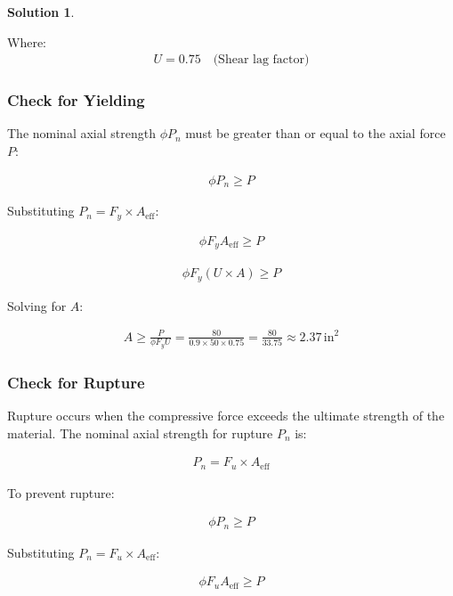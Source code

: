 \documentclass[12pt]{article}
\theoremstyle{definition} %
\newtheorem{solution}{Solution}
\theoremstyle{plain} %
\begin{document}
\begin{solution}
\begin{enumerate}
Where:
\begin{align}
U = 0.75 \quad \text{(Shear lag factor)}
\end{align}

\subsubsection*{Check for Yielding}

The nominal axial strength \( \phi P_n \) must be greater than or equal to the axial force \( P \):

\begin{align}
\phi P_n \geq P \tag{3}
\end{align}

Substituting \( P_n = F_y \times A_{\text{eff}} \):

\begin{align}
\phi F_y A_{\text{eff}} \geq P \tag{4}
\end{align}

\begin{align}
\phi F_y (U \times A) \geq P \tag{5}
\end{align}

Solving for \( A \):

\begin{align}
A \geq \frac{P}{\phi F_y U} = \frac{80}{0.9 \times 50 \times 0.75} = \frac{80}{33.75} \approx 2.37 \, \text{in}^2 \tag{6}
\end{align}

\subsubsection*{Check for Rupture}

Rupture occurs when the compressive force exceeds the ultimate strength of the material. The nominal axial strength for rupture \( P_n \) is:

\begin{align}
P_n = F_u \times A_{\text{eff}} \tag{7}
\end{align}

To prevent rupture:

\begin{align}
\phi P_n \geq P \tag{8}
\end{align}

Substituting \( P_n = F_u \times A_{\text{eff}} \):

\begin{align}
\phi F_u A_{\text{eff}} \geq P \tag{9}
\end{align}


\end{enumerate}
\end{solution}
\end{document}
